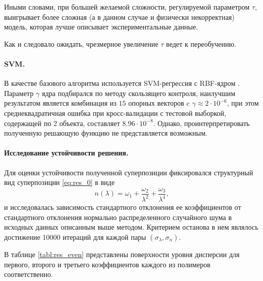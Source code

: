 \documentclass[12pt,a4paper]{article}
\begin{document}
Иными словами, при большей желаемой сложности,
регулируемой параметром $\tau$, выигрывает более сложная (а в данном случае и
физически некорректная) модель, которая лучше описывает экспериментальные данные.

Как и следовало ожидать, чрезмерное увеличение $\tau$ ведет к переобучению.

\paragraph{SVM.}

В качестве базового алгоритма используется SVM-регрессия с RBF-ядром \cite{Vapnik79}.
Параметр $\gamma$ ядра подбирался по методу скользящего контроля, наилучшим результатом является
комбинация из $15$ опорных векторов c $\gamma \approx 2 \cdot 10^{-6}$, при этом
среднеквадратичная ошибка при кросс-валидации с тестовой выборкой, содержащей по 2
объекта, составляет $8.96 \cdot 10^{-8}$. Однако, проинтерпретировать полученную
решающую функцию не представляется возможным.

\paragraph{Исследование устойчивости решения.}

Для оценки устойчивости полученной суперпозиции фиксировался структурный вид
суперпозиции \eqref{eq:res_0} в виде
\[
n(\lambda) = \omega_1 + \frac{\omega_2}{\lambda^2} + \frac{\omega_3}{\lambda^4},
\]
и исследовалась
зависимость стандартного отклонения ее коэффициентов от стандартного отклонения
нормально распределенного случайного шума в исходных данных описанным выше методом.
Критерием останова в нем являлось достижение 10000 итераций для каждой пары
$(\sigma_{\lambda}, \sigma_n)$.

В таблице \ref{tabl:res_even} представлены
поверхности уровня дисперсии для первого, второго и третьего коэффициентов каждого из полимеров
соответственно.
\end{document}
